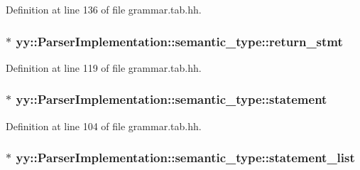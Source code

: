 Definition at line 136 of file grammar.tab.hh.

\hypertarget{unionyy_1_1_parser_implementation_1_1semantic__type_ac3638e919938f0806311a5d443032fd1}{
\subsubsection[{return\_\-stmt}]{$\ast$ {\bf yy::ParserImplementation::semantic\_\-type::return\_\-stmt}}}
\label{unionyy_1_1_parser_implementation_1_1semantic__type_ac3638e919938f0806311a5d443032fd1}


Definition at line 119 of file grammar.tab.hh.

\hypertarget{unionyy_1_1_parser_implementation_1_1semantic__type_a3e4314cc45f2bf84eb3a71533dcc1ca2}{
\subsubsection[{statement}]{$\ast$ {\bf yy::ParserImplementation::semantic\_\-type::statement}}}
\label{unionyy_1_1_parser_implementation_1_1semantic__type_a3e4314cc45f2bf84eb3a71533dcc1ca2}


Definition at line 104 of file grammar.tab.hh.

\hypertarget{unionyy_1_1_parser_implementation_1_1semantic__type_a4d6247af275221d65a95c8f171bb0dab}{
\subsubsection[{statement\_\-list}]{$\ast$ {\bf yy::ParserImplementation::semantic\_\-type::statement\_\-list}}}
\label{unionyy_1_1_parser_implementation_1_1semantic__type_a4d6247af275221d65a95c8f171bb0dab}


